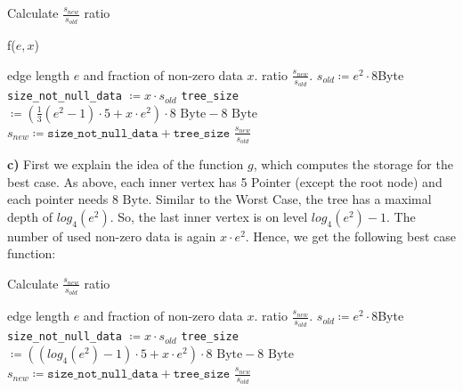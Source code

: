 \documentclass[english, fontsize=12pt, paper=a4, twoside=false, draft=true, pagesize=auto, version=last, DIV=16]{scrartcl}
\theoremstyle{break}
\begin{document}
\begin{algorithm}
\algrenewcommand{}
\algrenewcommand{}
\caption{Calculate $\frac{s_{new}}{s_{old}}$ ratio}
\medskip
{f($e, x$)}
\begin{algorithmic}[1]
  \Require edge length $e$ and fraction of non-zero data $x$.
  \Ensure ratio $\frac{s_{new}}{s_{old}}$.
  \State $s_{old} \coloneqq e^2 \cdot 8$Byte
  \State \texttt{size\_not\_null\_data} $\coloneqq x \cdot s_{old}$
  \State \texttt{tree\_size} $\coloneqq \left(\frac{1}{3}\left( e^2 - 1 \right) \cdot 5 + x \cdot e^2 \right) \cdot 8 \text{ Byte} - 8 \text{ Byte}$
  \State $s_{new} \coloneqq \texttt{size\_not\_null\_data} + \texttt{tree\_size}$
  \State \Return $\frac{s_{new}}{s_{old}}$
\end{algorithmic}
\end{algorithm}\par
\vspace*{15mm}


\textbf{c)}
First we explain the idea of the function $g$, which computes the storage for the best case. As above, each inner vertex has 5 Pointer (except the root node) and each pointer needs $8 \text{ Byte}$. Similar to the Worst Case, the tree has a maximal depth of $log_4(e^2)$. So, the last inner vertex is on level $log_4(e^2) - 1$. The number of used non-zero data is again $x \cdot e^2$. Hence, we get the following best case function: \par
\newpage
\begin{algorithm}
\caption{Calculate $\frac{s_{new}}{s_{old}}$ ratio}
\medskip
\begin{algorithmic}[1]
  \Require edge length $e$ and fraction of non-zero data $x$.
  \Ensure ratio $\frac{s_{new}}{s_{old}}$.
  \State $s_{old} \coloneqq e^2 \cdot 8$Byte
  \State \texttt{size\_not\_null\_data} $\coloneqq x \cdot s_{old}$
  \State \texttt{tree\_size} $\coloneqq \left( (log_4(e^2) - 1) \cdot 5 + x \cdot e^2 \right) \cdot 8 \text{ Byte} - 8 \text{ Byte}$
  \State $s_{new} \coloneqq \texttt{size\_not\_null\_data} + \texttt{tree\_size}$
    \State \Return $\frac{s_{new}}{s_{old}}$
\end{algorithmic}
\end{algorithm}\par
\vspace*{5mm}
\end{document}
